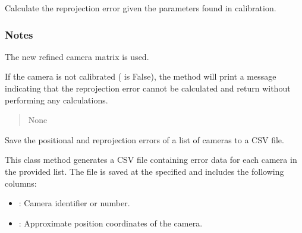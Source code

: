 \documentclass[letterpaper,10pt,english]{sphinxmanual}
\begin{document}
\begin{fulllineitems}
\begin{fulllineitems}
\label{\detokenize{CameraUtils:CameraUtils.Camera.RepError}}
\pysigstartsignatures
{}
\pysigstopsignatures
\sphinxAtStartPar
Calculate the re\sphinxhyphen{}projection error given the parameters found in calibration.
\subsubsection*{Notes}

\sphinxAtStartPar
The new refined camera matrix is used.

\sphinxAtStartPar
If the camera is not calibrated ( is False),
the method will print a message indicating that the re\sphinxhyphen{}projection error
cannot be calculated and return without performing any calculations.
\begin{quote}\begin{description}
\sphinxAtStartPar
None

\end{description}\end{quote}

\end{fulllineitems}


\begin{fulllineitems}
\label{\detokenize{CameraUtils:id22}}
\pysigstartsignatures
{}
\pysigstopsignatures
\sphinxAtStartPar
Save the positional and re\sphinxhyphen{}projection errors of a list of cameras to a CSV file.

\sphinxAtStartPar
This class method generates a CSV file containing error data for each
camera in the provided list. The file is saved at the specified 
and includes the following columns:
\begin{itemize}
\item {} 
\sphinxAtStartPar
{}: Camera identifier or number.

\item {} 
\sphinxAtStartPar
{}: Approximate position coordinates of the camera.


\end{itemize}
\end{fulllineitems}
\end{fulllineitems}
\end{document}
